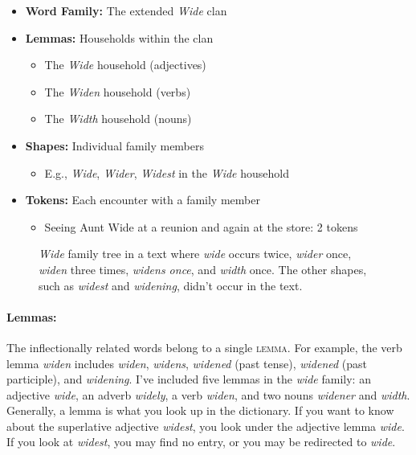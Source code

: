 \begin{tcolorbox}[title=A Family Analogy]
\begin{itemize}
    \item \textbf{Word Family:} The extended \textit{Wide} clan
    \item \textbf{Lemmas:} Households within the clan
    \begin{itemize}
        \item The \textit{Wide} household (adjectives)
        \item The \textit{Widen} household (verbs)
        \item The \textit{Width} household (nouns)
    \end{itemize}
    \item \textbf{Shapes:} Individual family members
    \begin{itemize}
        \item E.g., \textit{Wide}, \textit{Wider}, \textit{Widest} in the \textit{Wide} household
    \end{itemize}
    \item \textbf{Tokens:} Each encounter with a family member
    \begin{itemize}
        \item Seeing Aunt Wide at a reunion and again at the store: 2 tokens
    \end{itemize}
\end{itemize}
\end{tcolorbox}


\begin{figure}[htbp]
\centering
\caption{\textit{Wide} family tree in a text where \textit{wide} occurs twice, \textit{wider} once, \textit{widen} three times, \textit{widens once}, and \textit{width} once. The other shapes, such as \textit{widest} and \textit{widening}, didn't occur in the text.}
\label{fig:wide-family-tree}
\end{figure}


\paragraph*{Lemmas:}The inflectionally related words belong to a single \textsc{lemma}. For example, the verb lemma \textit{widen} includes \textit{widen}, \textit{widens}, \textit{widened} (past tense), \textit{widened} (past participle), and \textit{widening}. I've included five lemmas in the \textit{wide} family: an adjective \textit{wide}, an adverb \textit{widely}, a verb \textit{widen}, and two nouns \textit{widener} and \textit{width}. Generally, a lemma is what you look up in the dictionary. If you want to know about the superlative adjective \textit{widest}, you look under the adjective lemma \textit{wide}. If you look at \textit{widest}, you may find no entry, or you may be redirected to \textit{wide}.

